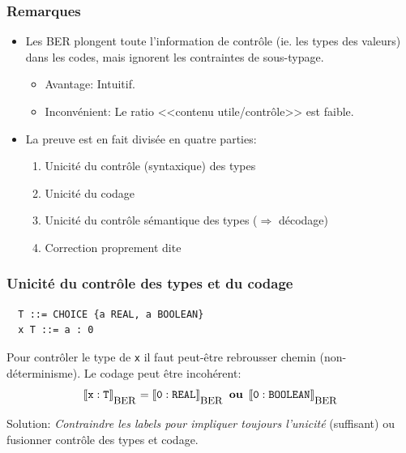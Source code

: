 \documentclass[compress,dvips,xcolor={dvipsnames},t]{beamer}
\begin{document}
\begin{frame}
\frametitle{Remarques}

\begin{itemize}

  \item Les BER plongent toute l'information de contrôle (ie. les types
        des valeurs) dans les codes, mais ignorent les contraintes de
        sous-typage.

        \begin{itemize}

          \item Avantage: Intuitif.

          \item Inconvénient: Le ratio <<contenu utile/contrôle>> est
                faible.

        \end{itemize}

  \item La preuve est en fait divisée en quatre parties:

        \begin{enumerate}

           \item Unicité du contrôle (syntaxique) des types

           \item Unicité du codage

           \item Unicité du contrôle sémantique des types ($\Rightarrow$ décodage)

           \item Correction proprement dite

        \end{enumerate}


\end{itemize}
\end{frame}


\begin{frame}[fragile]
\frametitle{Unicité du contrôle des types et du codage}

\begin{verbatim}
  T ::= CHOICE {a REAL, a BOOLEAN}
  x T ::= a : 0
\end{verbatim}

\noindent Pour contrôler le type de \verb+x+ il faut peut-être
rebrousser chemin (non-déterminisme). Le codage peut être incohérent:
$$\llbracket\verb+x+ : \verb+T+\rrbracket_{_{\textrm{\small BER}}} =
\llbracket\verb+0+ : \verb+REAL+\rrbracket_{_{\textrm{\small BER}}} \,\,\, \text{\bf ou} \,\,\, \llbracket\verb+0+ : \verb+BOOLEAN+\rrbracket_{_{\textrm{\small BER}}}$$

\noindent Solution: {\em Contraindre les labels pour impliquer
toujours l'unicité} (suffisant) ou fusionner contrôle des types et codage.

\end{frame}
\end{document}
